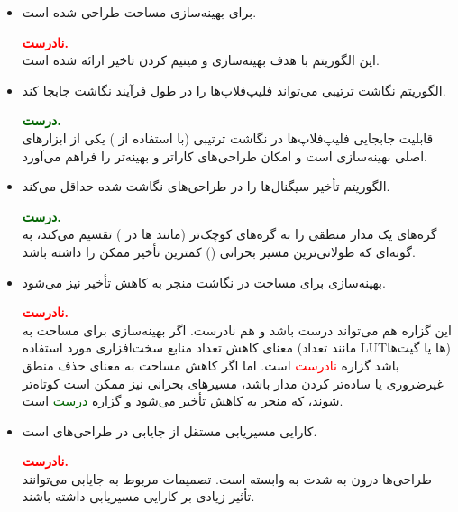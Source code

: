 \begin{itemize}
	
	
	
	\item {} برای بهینه‌سازی مساحت طراحی شده است.
	\begin{qsolve}
		\textbf{\textcolor{red}{نادرست.}}\\
		این الگوریتم با هدف بهینه‌سازی و مینیم کردن تاخیر ارائه شده است.
	\end{qsolve}
	
	
	
	
	\item الگوریتم نگاشت ترتیبی می‌تواند فلیپ‌فلاپ‌ها را در طول فرآیند نگاشت جابجا کند.
	\begin{qsolve}
		\textbf{\textcolor{darkgreen}{درست.}}\\
		قابلیت جابجایی فلیپ‌فلاپ‌ها در نگاشت ترتیبی (با استفاده از ) یکی از ابزارهای اصلی بهینه‌سازی است و امکان طراحی‌های کاراتر و بهینه‌تر را فراهم می‌آورد.
		
	\end{qsolve}
	
	
	
	
	\item الگوریتم  تأخیر سیگنال‌ها را در طراحی‌های نگاشت شده حداقل می‌کند.
	\begin{qsolve}
		\textbf{\textcolor{darkgreen}{درست.}}\\
		 گره‌های یک مدار منطقی را به گره‌های کوچک‌تر (مانند ها در ) تقسیم می‌کند، به گونه‌ای که طولانی‌ترین مسیر بحرانی () کمترین تأخیر ممکن را داشته باشد.
	\end{qsolve}
	
	
	
	\item بهینه‌سازی برای مساحت در نگاشت منجر به کاهش تأخیر نیز می‌شود.
	\begin{qsolve}
		\textbf{\textcolor{red}{نادرست.}}\\
		این گزاره هم می‌تواند درست باشد و هم نادرست. اگر بهینه‌سازی برای مساحت به معنای کاهش تعداد منابع سخت‌افزاری مورد استفاده (مانند تعداد LUTها یا گیت‌ها) باشد گزاره \textcolor{red}{نادرست} است. اما اگر کاهش مساحت به معنای حذف منطق غیرضروری یا ساده‌تر کردن مدار باشد، مسیرهای بحرانی نیز ممکن است کوتاه‌تر شوند، که منجر به کاهش تأخیر می‌شود و گزاره \textcolor{darkgreen}{درست} است.
	\end{qsolve}
	
	
	
	\item کارایی مسیریابی مستقل از جایابی در طراحی‌های  است.
	\begin{qsolve}
		\textbf{\textcolor{red}{نادرست.}}\\
		طراحی‌ها درون  به شدت به  وابسته است. تصمیمات مربوط به جایابی می‌توانند تأثیر زیادی بر کارایی مسیریابی داشته باشند.
	\end{qsolve}
	

\end{itemize}
